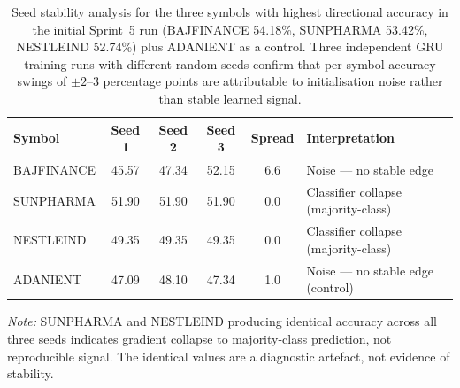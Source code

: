 \begin{table}[htbp]
\centering
\caption{%
  Seed stability analysis for the three symbols with highest directional
  accuracy in the initial Sprint~5 run (BAJFINANCE 54.18\%,
  SUNPHARMA 53.42\%, NESTLEIND 52.74\%) plus ADANIENT as a control.
  Three independent GRU training runs with different random seeds confirm
  that per-symbol accuracy swings of \(\pm 2\)--\(3\) percentage points
  are attributable to initialisation noise rather than stable learned signal.
}
\label{tab:seed_stability}
\setlength{\tabcolsep}{8pt}
\begin{tabular}{l
  S[table-format=2.2]
  S[table-format=2.2]
  S[table-format=2.2]
  S[table-format=1.1]
  l}
\toprule
\textbf{Symbol} &
  {\textbf{Seed 1}} &
  {\textbf{Seed 2}} &
  {\textbf{Seed 3}} &
  {\textbf{Spread}} &
  \textbf{Interpretation} \\
\midrule
BAJFINANCE & 45.57 & 47.34 & 52.15 & 6.6 & Noise — no stable edge \\
SUNPHARMA  & 51.90 & 51.90 & 51.90 & 0.0 & Classifier collapse (majority-class) \\
NESTLEIND  & 49.35 & 49.35 & 49.35 & 0.0 & Classifier collapse (majority-class) \\
ADANIENT   & 47.09 & 48.10 & 47.34 & 1.0 & Noise — no stable edge (control) \\
\bottomrule
\end{tabular}

\smallskip
\footnotesize
\textit{Note:} SUNPHARMA and NESTLEIND producing identical accuracy across all
three seeds indicates gradient collapse to majority-class prediction, not
reproducible signal. The identical values are a diagnostic artefact, not
evidence of stability.
\end{table}


